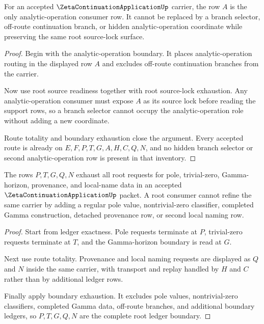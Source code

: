 \begin{theorem}
\label{thm:zeta-continuation-application-application-row-totality}
For an accepted $\ZetaContinuationApplicationUp$ carrier, the row $A$ is the only analytic-operation consumer row. It cannot be replaced by a branch selector, off-route continuation branch, or hidden analytic-operation coordinate while preserving the same root source-lock surface.
\end{theorem}
\begin{proof}
Begin with the analytic-operation boundary. It places analytic-operation routing in the displayed row $A$ and excludes off-route continuation branches from the carrier.

Now use root source readiness together with root source-lock exhaustion. Any analytic-operation consumer must expose $A$ as its source lock before reading the support rows, so a branch selector cannot occupy the analytic-operation role without adding a new coordinate.

Route totality and boundary exhaustion close the argument. Every accepted route is already on $E,F,P,T,G,A,H,C,Q,N$, and no hidden branch selector or second analytic-operation row is present in that inventory.
\end{proof}

\begin{theorem}
\label{thm:zeta-continuation-application-boundary-ledger-nonescape}
The rows $P,T,G,Q,N$ exhaust all root requests for pole, trivial-zero, Gamma-horizon, provenance, and local-name data in an accepted $\ZetaContinuationApplicationUp$ packet. A root consumer cannot refine the same carrier by adding a regular pole value, nontrivial-zero classifier, completed Gamma construction, detached provenance row, or second local naming row.
\end{theorem}
\begin{proof}
Start from ledger exactness. Pole requests terminate at $P$, trivial-zero requests terminate at $T$, and the Gamma-horizon boundary is read at $G$.

Next use route totality. Provenance and local naming requests are displayed as $Q$ and $N$ inside the same carrier, with transport and replay handled by $H$ and $C$ rather than by additional ledger rows.

Finally apply boundary exhaustion. It excludes pole values, nontrivial-zero classifiers, completed Gamma data, off-route branches, and additional boundary ledgers, so $P,T,G,Q,N$ are the complete root ledger boundary.
\end{proof}

